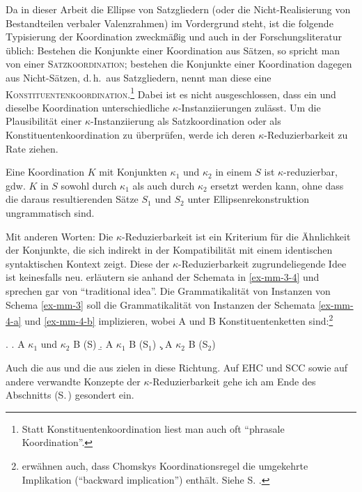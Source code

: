 Da in dieser Arbeit die Ellipse von Satzgliedern (oder die Nicht-Realisierung von Bestandteilen verbaler Valenzrahmen) im Vordergrund steht, ist die folgende Typisierung der Koordination zweckmä\ss ig und auch in der Forschungsliteratur üblich: Bestehen die Konjunkte einer Koordination aus Sätzen, so spricht man von einer \textsc{Satzkoordination}; bestehen die Konjunkte einer Koordination dagegen aus Nicht-Sätzen, d.\,h.\ aus Satzgliedern, nennt man diese eine \textsc{Konstituentenkoordination}.\footnote{Statt Konstituentenkoordination liest man auch oft "`phrasale Koordination"'.} Dabei ist es nicht ausgeschlossen, dass ein und dieselbe Koordination unterschiedliche $\kappa$-Instanziierungen zulässt. Um die Plausibilität einer $\kappa$-Instanziierung als Satzkoordination oder als Konstituentenkoordination zu überprüfen, werde ich deren $\kappa$-Reduzierbarkeit zu Rate ziehen.
\begin{definition} Eine Koordination $K$ mit Konjunkten $\kappa_1$ und $\kappa_2$ in einem  $S$ ist $\kappa$-reduzierbar, gdw. $K$ in $S$ sowohl durch $\kappa_1$ als auch durch $\kappa_2$ ersetzt werden kann, ohne dass die daraus resultierenden Sätze $S_1$ und $S_2$ unter Ellipsenrekonstruktion ungrammatisch sind.
\end{definition}
Mit anderen Worten: Die $\kappa$-Reduzierbarkeit ist ein Kriterium für die Ähnlichkeit der Konjunkte, die sich indirekt in der Kompatibilität mit einem identischen syntaktischen Kontext zeigt. Diese der $\kappa$-Reduzierbarkeit zugrundeliegende Idee ist keinesfalls neu. \cite{Maxwell:Manning:96} erläutern sie anhand der Schemata in \ref{ex-mm-3-4} und sprechen gar von "`traditional idea"'. Die Grammatikalität von Instanzen von Schema \ref{ex-mm-3} soll die Grammatikalität von Instanzen der Schemata \ref{ex-mm-4-a} und \ref{ex-mm-4-b} implizieren, wobei A und B Konstituentenketten sind:\footnote{\cite{Maxwell:Manning:96} erwähnen auch, dass Chomskys Koordinationsregel \citep[35]{Chomsky:57} die umgekehrte Implikation ("`backward implication"') enthält. Siehe S. \pageref{sec-koordinationsellipsen-5}.}

\ex. \label{ex-mm-3-4} 
\a. \label{ex-mm-3}A $\kappa_1$ und $\kappa_2$ B  \hfill	(S)\phantom{$_1$}
\b. \label{ex-mm-4-a}A $\kappa_1$ B \hfill (S$_1$)	
\c. \label{ex-mm-4-b}A $\kappa_2$ B \hfill (S$_2$)
   
Auch die  aus \citet{Hoehle:90,Hoehle:91} und die  aus \cite{Kathol:99} zielen in diese Richtung. Auf EHC und SCC sowie auf andere verwandte Konzepte der $\kappa$-Reduzierbarkeit gehe ich am Ende des Abschnitts (S.\,\pageref{sec-koordinationsellipsen-5}) gesondert ein. 

